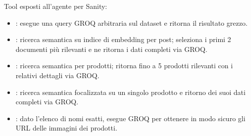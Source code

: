 Tool esposti all’agente per Sanity:
\begin{itemize}
  \item \texttt{}: esegue una query GROQ arbitraria sul dataset e ritorna il risultato grezzo.
  \item \texttt{}: ricerca semantica su indice di embedding per post; seleziona i primi 2 documenti più rilevanti e ne ritorna i dati completi via GROQ.
  \item \texttt{}: ricerca semantica per prodotti; ritorna fino a 5 prodotti rilevanti con i relativi dettagli via GROQ.
  \item \texttt{}: ricerca semantica focalizzata su un singolo prodotto e ritorno dei suoi dati completi via GROQ.
  \item \texttt{}: dato l’elenco di nomi esatti, esegue GROQ per ottenere in modo sicuro gli URL delle immagini dei prodotti.
\end{itemize}
